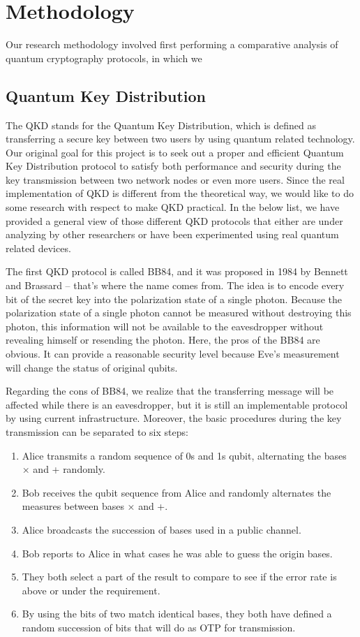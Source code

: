 \documentclass[sigconf]{acmart}
\begin{document}
\section{Methodology}
Our research methodology involved first performing a comparative analysis of quantum cryptography protocols, in which we 

\subsection{Quantum Key Distribution}
The QKD stands for the Quantum Key Distribution, which is defined as transferring a secure key between two users by using quantum related technology\cite{khan_security_2020}. Our original goal for this project is to seek out a proper and efficient Quantum Key Distribution protocol to satisfy both performance and security during the key transmission between two network nodes or even more users. Since the real implementation of QKD is different from the theoretical way, we would like to do some research with respect to make QKD practical. In the below list, we have provided a general view of those different QKD protocols that either are under analyzing by other researchers or have been experimented using real quantum related devices.

The first QKD protocol is called BB84, and it was proposed in 1984 by Bennett and Brassard – that's where the name comes from. The idea is to encode every bit of the secret key into the polarization state of a single photon. Because the polarization state of a single photon cannot be measured without destroying this photon, this information will not be available to the eavesdropper without revealing himself or resending the photon. Here, the pros of the BB84 are obvious. It can provide a reasonable security level because Eve's measurement will change the status of original qubits.
 
Regarding the cons of BB84, we realize that the transferring message will be affected while there is an eavesdropper, but it is still an implementable protocol by using current infrastructure. Moreover, the basic procedures during the key transmission can be separated to six steps:
\begin{enumerate}
\item Alice transmits a random sequence of 0s and 1s qubit, alternating the bases × and + randomly.
\item Bob receives the qubit sequence from Alice and randomly alternates the measures between bases × and +.
\item Alice broadcasts the succession of bases used in a public channel.
\item Bob reports to Alice in what cases he was able to guess the origin bases.
\item They both select a part of the result to compare to see if the error rate is above or under the requirement.
\item By using the bits of two match identical bases, they both have defined a random succession of bits that will do as OTP for transmission.
\end{enumerate}
 
\end{document}
